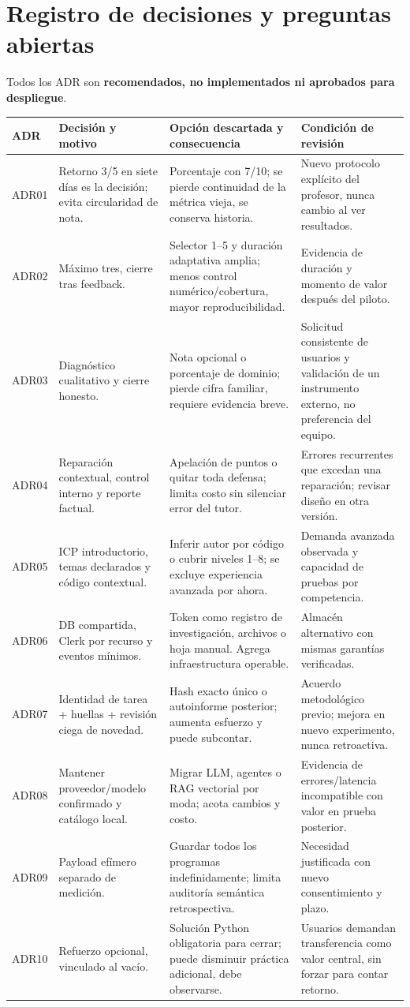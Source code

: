 \documentclass[11pt,a4paper]{report}
\begin{document}
\chapter{Registro de decisiones y preguntas abiertas}
\label{ch:adr}
Todos los ADR son \textbf{recomendados, no implementados ni aprobados para despliegue}.
\begin{longtable}{P{1.7cm}P{5.1cm}P{5.2cm}P{4cm}}
\toprule ADR & Decisión y motivo & Opción descartada y consecuencia & Condición de revisión \\\midrule\endhead
ADR01 & Retorno 3/5 en siete días es la decisión; evita circularidad de nota. & Porcentaje con 7/10; se pierde continuidad de la métrica vieja, se conserva historia. & Nuevo protocolo explícito del profesor, nunca cambio al ver resultados.\\
ADR02 & Máximo tres, cierre tras feedback. & Selector 1--5 y duración adaptativa amplia; menos control numérico/cobertura, mayor reproducibilidad. & Evidencia de duración y momento de valor después del piloto.\\
ADR03 & Diagnóstico cualitativo y cierre honesto. & Nota opcional o porcentaje de dominio; pierde cifra familiar, requiere evidencia breve. & Solicitud consistente de usuarios y validación de un instrumento externo, no preferencia del equipo.\\
ADR04 & Reparación contextual, control interno y reporte factual. & Apelación de puntos o quitar toda defensa; limita costo sin silenciar error del tutor. & Errores recurrentes que excedan una reparación; revisar diseño en otra versión.\\
ADR05 & ICP introductorio, temas declarados y código contextual. & Inferir autor por código o cubrir niveles 1--8; se excluye experiencia avanzada por ahora. & Demanda avanzada observada y capacidad de pruebas por competencia.\\
ADR06 & DB compartida, Clerk por recurso y eventos mínimos. & Token como registro de investigación, archivos o hoja manual. Agrega infraestructura operable. & Almacén alternativo con mismas garantías verificadas.\\
ADR07 & Identidad de tarea + huellas + revisión ciega de novedad. & Hash exacto único o autoinforme posterior; aumenta esfuerzo y puede subcontar. & Acuerdo metodológico previo; mejora en nuevo experimento, nunca retroactiva.\\
ADR08 & Mantener proveedor/modelo confirmado y catálogo local. & Migrar LLM, agentes o RAG vectorial por moda; acota cambios y costo. & Evidencia de errores/latencia incompatible con valor en prueba posterior.\\
ADR09 & Payload efímero separado de medición. & Guardar todos los programas indefinidamente; limita auditoría semántica retrospectiva. & Necesidad justificada con nuevo consentimiento y plazo.\\
ADR10 & Refuerzo opcional, vinculado al vacío. & Solución Python obligatoria para cerrar; puede disminuir práctica adicional, debe observarse. & Usuarios demandan transferencia como valor central, sin forzar para contar retorno.\\\bottomrule
\end{longtable}
\end{document}

